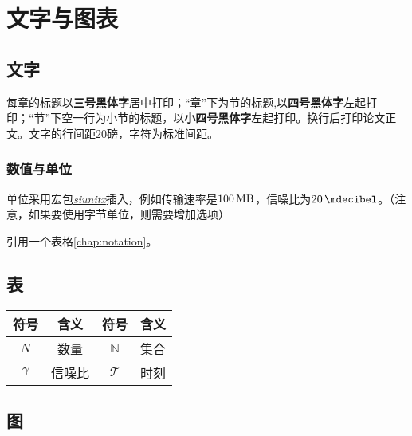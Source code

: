 \chapter{文字与图表}
\section{文字}
每章的标题以\textbf{三号黑体字}居中打印；“章”下为节的标题,以\textbf{四号黑体字}左起打印；“节”下空一行为小节的标题，以\textbf{小四号黑体字}左起打印。换行后打印论文正文。文字的行间距20磅，字符为标准间距。

\subsection{数值与单位}

单位采用宏包\href{http://mirrors.sjtug.sjtu.edu.cn/ctan/macros/latex/contrib/siunitx/siunitx.pdf}{\textit{siunitx}}插入，例如传输速率是$\SI{100}{\mega\byte}$，信噪比为$\SI{20}{\mdecibel}$。（注意，如果要使用字节单位，则需要增加选项）

引用一个表格\ref{chap:notation}。

\section{表}

\begin{table*}[!htb]
	\centering
	\caption{数学符号含义表（标题及序号置于表的正上方）}
	\label{chap:notation}
	\begin{tabular}{|c|c||c|c|}
		\hline
		\rowcolor{LightSteelBlue}
		\textbf{符号} 			& \textbf{含义} 	    & \textbf{符号}		  & \textbf{含义} 		   	 \\
		\hline
		$N$ 					 & 数量		   		 & $\mathbb{N}$ 		 & 集合 						\\
		\hline
		$\gamma$ 				 & 信噪比			    & $\mathcal{T}$ 		& 时刻		 			   \\
		\hline
	\end{tabular}
\end{table*}

\section{图}


